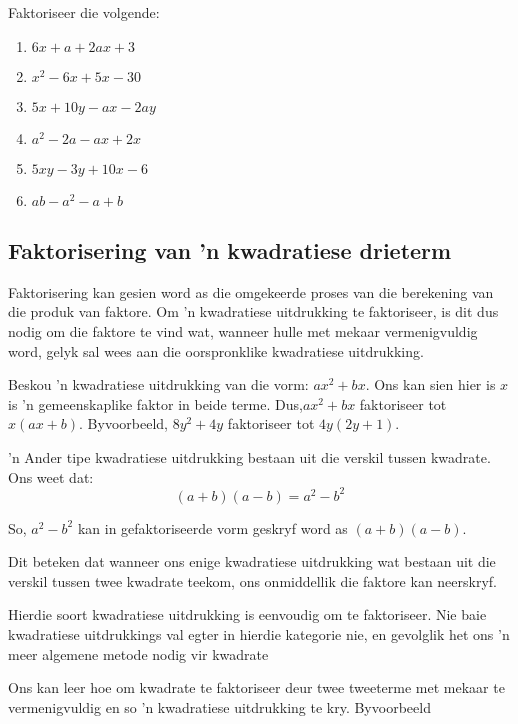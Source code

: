 \begin{exercises}{}{
\nopagebreak
Faktoriseer die volgende:
\begin{multicols}{2}
\begin{enumerate}[itemsep=5pt, label=\textbf{\arabic*}. ] 
\item $6x+a+2ax+3$
\item ${x}^{2}-6x+5x-30$
\item $5x+10y-ax-2ay$
\item ${a}^{2}-2a-ax+2x$
\item $5xy-3y+10x-6$
\item $ab - a^{2} - a + b$
\end{enumerate}
\end{multicols}

}
\end{exercises}

\subsection* {Faktorisering van 'n kwadratiese drieterm}

    
Faktorisering kan gesien word as die omgekeerde proses van die berekening van die produk van faktore. Om
’n kwadratiese uitdrukking te faktoriseer, is dit dus nodig om die faktore te vind wat, wanneer hulle met mekaar
vermenigvuldig word, gelyk sal wees aan die oorspronklike kwadratiese uitdrukking.\par 

Beskou ’n kwadratiese uitdrukking van die vorm: $a{x}^{2}+bx$. Ons kan sien hier is  $x$ is ’n gemeenskaplike faktor in
beide terme. Dus,$a{x}^{2}+bx$  faktoriseer tot $x(ax+b)$. Byvoorbeeld, $8{y}^{2}+4y$ faktoriseer tot  $4y(2y+1)$.\par 
’n Ander tipe kwadratiese uitdrukking bestaan uit die verskil tussen kwadrate. Ons weet dat:
\begin{equation*}
(a+b)(a-b)={a}^{2}-{b}^{2}
\end{equation*}

So, $a^2-b^2$ kan in gefaktoriseerde vorm geskryf word as $(a+b)(a-b)$. \par

Dit beteken dat wanneer ons enige kwadratiese uitdrukking wat bestaan uit die verskil tussen twee kwadrate teekom, ons onmiddellik die faktore kan neerskryf.


Hierdie soort kwadratiese uitdrukking is eenvoudig om te faktoriseer. Nie baie kwadratiese uitdrukkings val egter
in hierdie kategorie nie, en gevolglik het ons ’n meer algemene metode nodig vir kwadrate
\par 
Ons kan leer hoe om kwadrate te faktoriseer deur twee tweeterme met mekaar te vermenigvuldig en so ’n kwadratiese uitdrukking te kry. Byvoorbeeld

